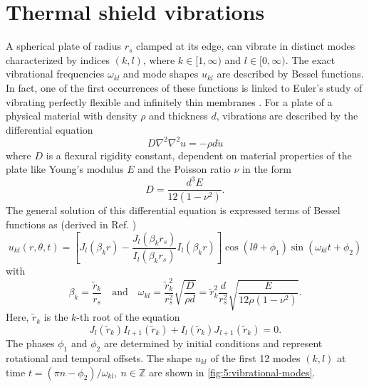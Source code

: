 \section{Thermal shield vibrations}\label{sec:5:thermal-vibrations}

A spherical plate of radius $r_s$ clamped at its edge, can vibrate in distinct modes characterized by indices $(k,l)$, where $k \in [1,\infty)$ and $l \in [0, \infty)$.
The exact vibrational frequencies $\omega_{kl}$ and mode shapes $u_{kl}$ are described by Bessel functions.
In fact, one of the first occurrences of these functions is linked to Euler's study of vibrating perfectly flexible and infinitely thin membranes \cite{Dutka_1995}.
For a plate of a physical material with density $\rho$ and thickness $d$, vibrations are described by the differential equation \cite[p. 490]{Rao_2019}
\begin{equation}
  D \nabla^2\nabla^2 u = -\rho d \ddot{u}
\end{equation} 
where $D$ is a flexural rigidity constant, dependent on material properties of the plate like Young's modulus $E$ and the Poisson ratio $\nu$ in the form
\begin{equation}
  D = \frac{d^3 E}{12(1-\nu^2)} .
\end{equation}
The general solution of this differential equation is expressed terms of Bessel functions as (derived in Ref. \cite[p. 490-495]{Rao_2019}) 
\begin{equation}
  u_{kl}(r, \theta, t) = \left[J_l(\beta_k r) - \frac{J_l(\beta_k r_s)}{I_l(\beta_k r_s)}I_l(\beta_k r)\right]\cos(l\theta+\phi_1)\sin(\omega_{kl}t+\phi_2)
\end{equation}
with
\begin{equation} \label{eq:5:vibration-frequency}
  \beta_k = \frac{\tilde{r}_k}{r_s} \quad \text{and} \quad \omega_{kl} = \frac{\tilde{r}_k^2}{r_s^2}\sqrt{\frac{D}{\rho d}} = \tilde{r}_k^2\frac{d}{r_s^2}\sqrt{\frac{E}{12\rho(1-\nu^2)}} .
\end{equation}
Here, $\tilde{r}_k$ is the $k$-th root of the equation
\begin{equation}\label{eq:5:bessel-zeros}
  J_l(\tilde{r}_k)I_{l+1}(\tilde{r}_k)+I_l(\tilde{r}_k)J_{l+1}(\tilde{r}_k) = 0 .
\end{equation}
The phases $\phi_1$ and $\phi_2$ 
are determined by initial conditions and represent rotational and temporal offsets.
The shape $u_{kl}$ of the first 12 modes $(k,l)$ at time $t=(\pi n - \phi_2) / \omega_{kl},\ n\in\mathbb{Z}$ are shown in \cref{fig:5:vibrational-modes}.
